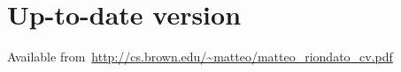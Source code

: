 \documentclass[margin,line]{resume}
\begin{document}
\iffalse
\section {\sc Technical Skills}
{\bf Programming Languages}
\begin{list2}
\vspace*{.05in}
\item Fluent in the following languages: C/C++, Python, Java, and bash.
\end{list2}

{\bf Operating Systems}
\begin{list2}
  \vspace*{.05in}
\item Expert user and administrator of FreeBSD systems and various flavours of GNU/Linux
  distributions.
\end{list2}

\section {\sc Citizenship}

Italian

\section{\sc Updated}
\today
\fi

\section{\sc Up-to-date version} Available from~\url{http://cs.brown.edu/~matteo/matteo\_riondato\_cv.pdf}
\end{document}
